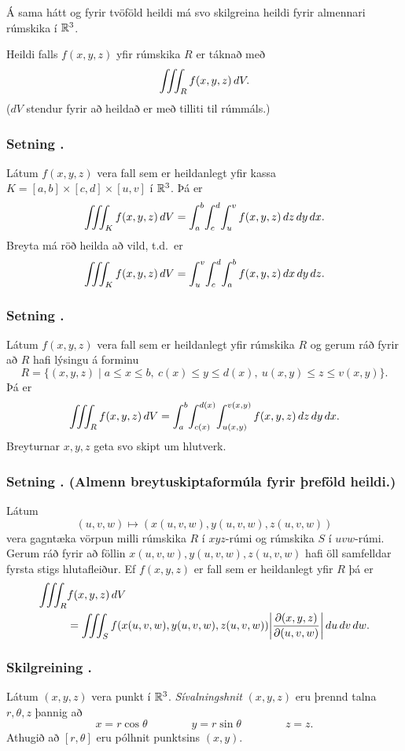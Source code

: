 \medskip
Á sama hátt og fyrir tvöföld heildi má svo skilgreina heildi fyrir almennari rúmskika í ${\mathbb R}^3$. 

\medskip
Heildi falls $f(x,y,z)$ yfir rúmskika $R$ er táknað með 
$$\int\!\!\!\int\!\!\!\int_R f(x,y,z)\,dV.$$
($dV$ stendur fyrir að heildað er með tilliti til rúmmáls.)



\subsubsection{Setning \kaflanr.}
 Látum $f(x,y,z)$ vera fall sem er heildanlegt yfir kassa $K=[a,b]\times[c,d]\times[u,v]$ í ${\mathbb R}^3$.  Þá er
$$\thrint_K f(x,y,z)\,dV=
\int_a^b\!\int_c^d\!\int_u^v f(x,y,z)\,dz\,dy\,dx.$$ 
Breyta má röð heilda að vild, t.d.\ er 
$$\thrint_K f(x,y,z)\,dV=
\int_u^v\!\int_c^d\!\int_a^b f(x,y,z)\,dx\,dy\,dz.$$ 


\subsubsection{Setning \kaflanr.}
 Látum $f(x,y,z)$ vera fall sem er heildanlegt yfir rúmskika $R$ og gerum ráð fyrir að $R$ hafi lýsingu á forminu
$$R=\{(x,y,z)\mid a\leq x\leq b,\ c(x)\leq y\leq d(x),\ u(x,y)\leq z\leq v(x,y)\}.$$
Þá er
$$\thrint_R f(x,y,z)\,dV=
\int_a^b\!\int_{c(x)}^{d(x)}\!\int_{u(x,y)}^{v(x,y)} f(x,y,z)\,dz\,dy\,dx.$$ 
Breyturnar $x, y, z$ geta svo skipt um hlutverk.



\subsubsection{Setning \kaflanr. (Almenn breytuskiptaformúla fyrir þreföld heildi.) }
 Látum 
$$(u,v,w)\mapsto (x(u,v,w), y(u,v,w), z(u,v,w))$$
vera gagntæka vörpun milli rúmskika $R$ í $xyz$-rúmi og rúmskika $S$ í $uvw$-rúmi.  Gerum ráð fyrir að föllin $x(u,v,w), y(u,v,w), z(u,v,w)$ hafi öll samfelldar fyrsta stigs hlutafleiður.  Ef $f(x,y,z)$ er fall sem er heildanlegt yfir $R$ þá er
\begin {align*}
\thrint_R& f(x,y,z)\,dV \\&=\thrint_S f(x(u,v,w), y(u,v,w), z(u,v,w))
\bigg|\frac{\partial(x,y,z)}{\partial(u,v,w)}\bigg|\,du\,dv\,dw.
\end {align*}


\subsubsection{Skilgreining \kaflanr.}
 Látum $(x,y,z)$ vera punkt í ${\mathbb R}^3$.  {\em Sívalningshnit} $(x,y,z)$ eru þrennd talna $r, \theta, z$ þannig að 
$$x=r\cos\theta\qquad\qquad y=r\sin\theta\qquad\qquad z=z.$$
Athugið að $[r,\theta]$ eru pólhnit punktsins $(x,y)$. 


